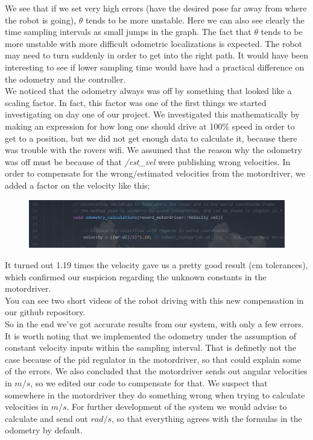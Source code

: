 \documentclass[a4paper,10pt]{article}
\begin{document}
		We see that if we set very high errors (have the desired pose far away from where the robot is going), $\theta$ tends to be more unstable. Here we can also see clearly the time sampling
		intervals as small jumps in the graph. The fact that $\theta$ tends to be more unstable with more difficult odometric localizations is expected. The robot may need to turn suddenly in order
		to get into the right path. It would have been interesting to see if lower sampling time would have had a practical difference on the odometry and the controller.\\
		We noticed that the odometry always was off by something that looked like a scaling factor. In fact, this factor was one of the first things we started investigating on day one of our project.
		We investigated this mathematically by making an expression for how long one should drive at 100\% speed in order to get to a position, but we did not get enough data to calculate it, because
		there was trouble with the rovers wifi. We assumed that the reason why the odometry was off must be because of that \textit{/est\_vel} were publishing wrong velocities. In order to
		compensate for the wrong/estimated velocities from the motordriver, we added a factor on the velocity like this;

		\begin{figure}[H]
		\centering
		\includegraphics[width=1\textwidth]{snippet_adjustment_factor.JPG}
		\end{figure}
		It turned out 1.19 times the velocity gave us a pretty good result (cm tolerances), which confirmed our suspicion regarding the unknown constants in the motordriver.\\
		You can see two short videos of the robot driving with this new compensation in our github repository.\\


		So in the end we've got accurate results from our system, with only a few errors. It is worth noting that we implemented the odometry under the assumption of constant velocity inputs within the sampling
		interval. That is definetly not the case because of the pid regulator in the motordriver, so that could explain some of the errors. We also concluded that the motordriver sends
		out angular velocities in $m/s$, so we edited our code to compensate for that. We suspect that somewhere in the motordriver they do something wrong when trying to calculate velocities in
		$m/s$. For further development of the system we would advise to calculate and send out $rad/s$, so that everything agrees with the formulas in the odometry by default.
\end{document}
